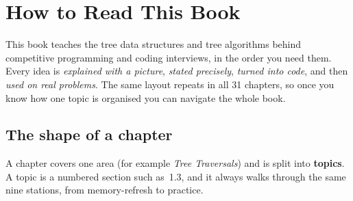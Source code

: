 \chapter{How to Read This Book}

This book teaches the tree data structures and tree algorithms behind
competitive programming and coding interviews, in the order you need them.
Every idea is \emph{explained with a picture}, \emph{stated precisely},
\emph{turned into code}, and then \emph{used on real problems}. The same
layout repeats in all 31 chapters, so once you know how one topic is
organised you can navigate the whole book.

\section*{The shape of a chapter}

A chapter covers one area (for example \emph{Tree Traversals}) and is split
into \textbf{topics}. A topic is a numbered section such as~1.3, and it
always walks through the same nine stations, from memory-refresh to practice.

